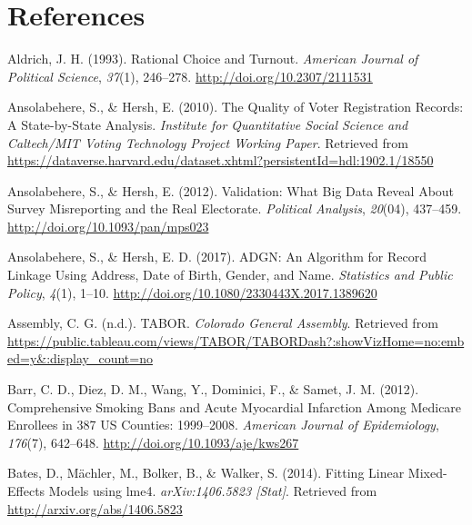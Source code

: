 \documentclass[12pt,twoside]{reedthesis}
\begin{document}
  \appendix
  
  \backmatter
  
  \chapter{References}\label{references}
  
  \noindent
  
  \setlength{\parindent}{-0.20in} \setlength{\leftskip}{0.20in}
  \setlength{\parskip}{8pt}
  
  \hypertarget{refs}{}
  \hypertarget{ref-aldrich_rational_1993}{}
  Aldrich, J. H. (1993). Rational Choice and Turnout. \emph{American
  Journal of Political Science}, \emph{37}(1), 246--278.
  \url{http://doi.org/10.2307/2111531}
  
  \hypertarget{ref-ansolabehere_quality_2010}{}
  Ansolabehere, S., \& Hersh, E. (2010). The Quality of Voter Registration
  Records: A State-by-State Analysis. \emph{Institute for Quantitative
  Social Science and Caltech/MIT Voting Technology Project Working Paper}.
  Retrieved from
  \url{https://dataverse.harvard.edu/dataset.xhtml?persistentId=hdl:1902.1/18550}
  
  \hypertarget{ref-ansolabehere_validation:_2012}{}
  Ansolabehere, S., \& Hersh, E. (2012). Validation: What Big Data Reveal
  About Survey Misreporting and the Real Electorate. \emph{Political
  Analysis}, \emph{20}(04), 437--459.
  \url{http://doi.org/10.1093/pan/mps023}
  
  \hypertarget{ref-ansolabehere_adgn:_2017}{}
  Ansolabehere, S., \& Hersh, E. D. (2017). ADGN: An Algorithm for Record
  Linkage Using Address, Date of Birth, Gender, and Name. \emph{Statistics
  and Public Policy}, \emph{4}(1), 1--10.
  \url{http://doi.org/10.1080/2330443X.2017.1389620}
  
  \hypertarget{ref-colorado_general_assembly_tabor_nodate}{}
  Assembly, C. G. (n.d.). TABOR. \emph{Colorado General Assembly}.
  Retrieved from
  \url{https://public.tableau.com/views/TABOR/TABORDash?:showVizHome=no:embed=y\&:display_count=no}
  
  \hypertarget{ref-barr_comprehensive_2012}{}
  Barr, C. D., Diez, D. M., Wang, Y., Dominici, F., \& Samet, J. M.
  (2012). Comprehensive Smoking Bans and Acute Myocardial Infarction Among
  Medicare Enrollees in 387 US Counties: 1999--2008. \emph{American
  Journal of Epidemiology}, \emph{176}(7), 642--648.
  \url{http://doi.org/10.1093/aje/kws267}
  
  \hypertarget{ref-bates_fitting_2014}{}
  Bates, D., Mächler, M., Bolker, B., \& Walker, S. (2014). Fitting Linear
  Mixed-Effects Models using lme4. \emph{arXiv:1406.5823 {[}Stat{]}}.
  Retrieved from \url{http://arxiv.org/abs/1406.5823}
  
\end{document}
